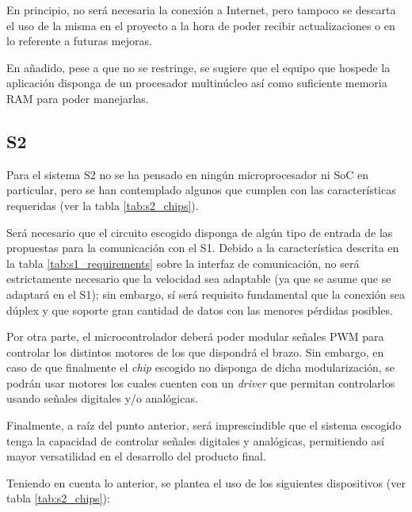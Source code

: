 En principio, no será necesaria la conexión a Internet, pero tampoco se descarta el uso de la misma en el proyecto a la hora de poder recibir actualizaciones o en lo referente a futuras mejoras.

En añadido, pese a que no se restringe, se sugiere que el equipo que hospede la aplicación disponga de un procesador multinúcleo así como suficiente memoria \ac{RAM} para poder manejarlas.

\subsection*{\ac{S2}}
Para el sistema \ac{S2} no se ha pensado en ningún microprocesador ni \ac{SoC} en particular, pero se han contemplado algunos que cumplen con las características requeridas (ver la tabla \ref{tab:s2_chips}).

Será necesario que el circuito escogido disponga de algún tipo de entrada de las propuestas para la comunicación con el \ac{S1}. Debido a la característica descrita en la tabla \ref{tab:s1_requirements} sobre la interfaz de comunicación, no será estrictamente necesario que la velocidad sea adaptable (ya que se asume que se adaptará en el \ac{S1}); sin embargo, sí será requisito fundamental que la conexión sea dúplex y que soporte gran cantidad de datos con las menores pérdidas posibles.

Por otra parte, el microcontrolador deberá poder modular señales \ac{PWM} para controlar los distintos motores de los que dispondrá el brazo. Sin embargo, en caso de que finalmente el \textit{chip} escogido no disponga de dicha modularización, se podrán usar motores los cuales cuenten con un \textit{driver} que permitan controlarlos usando señales digitales y/o analógicas.

Finalmente, a raíz del punto anterior, será imprescindible que el sistema escogido tenga la capacidad de controlar señales digitales y analógicas, permitiendo así mayor versatilidad en el desarrollo del producto final.

Teniendo en cuenta lo anterior, se plantea el uso de los siguientes dispositivos (ver tabla \ref{tab:s2_chips}):

